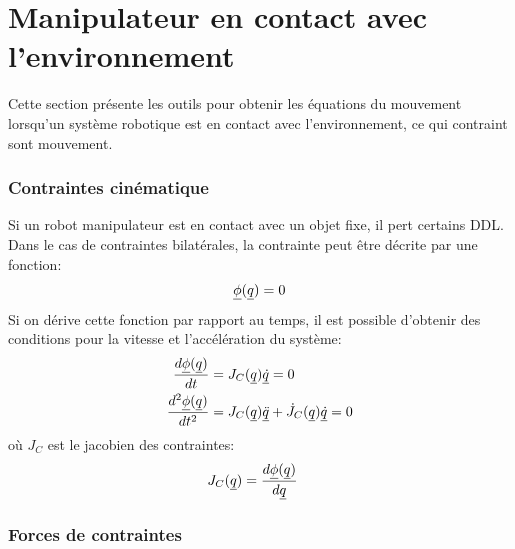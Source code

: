 \newpage
\section{Manipulateur en contact avec l'environnement}
\label{sec:contact}

Cette section présente les outils pour obtenir les équations du mouvement lorsqu'un système robotique est en contact avec l'environnement, ce qui contraint sont mouvement. 

\subsubsection{Contraintes cinématique}
\label{sec:constraints}
Si un robot manipulateur est en contact avec un objet fixe, il pert certains DDL. Dans le cas de contraintes bilatérales, la contrainte peut être décrite par une fonction:
\begin{align}
\underline{\phi}( \underline{ q } ) = 0
\label{eq:constraint}
\end{align}
Si on dérive cette fonction par rapport au temps, il est possible d'obtenir des conditions pour la vitesse et l'accélération du système:
\begin{align}
\frac{d \underline{\phi}( \underline{ q } ) }{dt}     &= J_C( \underline{ q } ) \underline{\dot{q}}  = 0 \\
\frac{d^2 \underline{\phi}( \underline{ q } ) }{dt^2} &= J_C( \underline{ q } ) \underline{\ddot{q}}  + \dot{J}_C( \underline{ q } ) \underline{\dot{q}} = 0 
\label{eq:constraint_diff}
\end{align}
où $J_C$ est le jacobien des contraintes:
\begin{align}
J_C( \underline{ q } )                    &= \frac{d \underline{\phi}( \underline{ q } ) }{d\underline{ q }}
\label{eq:constraint_jaco}
\end{align}

\subsubsection{Forces de contraintes}
\label{sec:constraint_forces}

